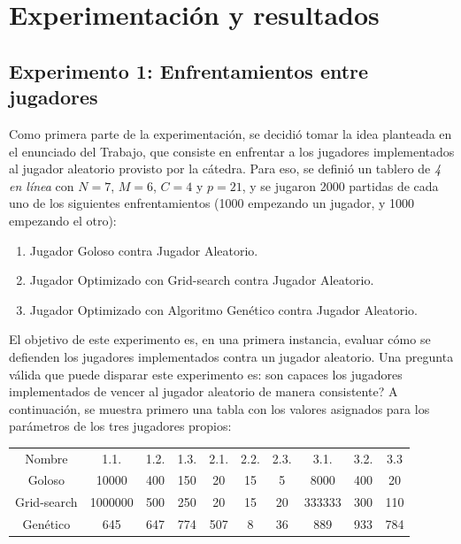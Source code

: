\documentclass[12pt,a4paper]{article}
\begin{document}
\newpage

		
	
\section{Experimentación y resultados}


    \subsection{Experimento 1: Enfrentamientos entre jugadores}
    
    Como primera parte de la experimentación, se decidió tomar la idea planteada en el enunciado del Trabajo, que consiste en enfrentar a los jugadores implementados al jugador aleatorio provisto por la cátedra. Para eso, se definió un tablero de \textit{4 en línea} con $N=7$, $M=6$, $C=4$ y $p=21$, y se jugaron 2000 partidas de cada uno de los siguientes enfrentamientos (1000 empezando un jugador, y 1000 empezando el otro):
        \begin{enumerate}
            \item Jugador Goloso contra Jugador Aleatorio.
            \item Jugador Optimizado con Grid-search contra Jugador Aleatorio.
            \item Jugador Optimizado con Algoritmo Genético contra Jugador Aleatorio.
        \end{enumerate}
    
    El objetivo de este experimento es, en una primera instancia, evaluar cómo se defienden los jugadores implementados contra un jugador aleatorio. Una pregunta válida que puede disparar este experimento es: \textquestiondown son capaces los jugadores implementados de vencer al jugador aleatorio de manera consistente? A continuación, se muestra primero una tabla con los valores asignados para los parámetros de los tres jugadores propios:
    
    \begin{center}
		\begin{tabular}{ | c || c | c | c | c | c | c | c | c | c | }
		\hline
		Nombre &  1.1. &  1.2. &  1.3. &  2.1. &  2.2. &  2.3. &  3.1. &  3.2. &  3.3 \\ \hhline{|=#=|=|=|=|=|=|=|=|=|}
            Goloso &  10000 &  400 &  150 &  20 &  15 &  5 &  8000 &  400 &  20 \\ \hline
		    Grid-search &  1000000 &  500 &  250 &  20 &  15 &  20 &  333333 &  300 &  110 \\ \hline
		    Genético &  645 &  647 &  774 &  507 &  8 &  36 &  889 &  933 &  784 \\ \hline
		\end{tabular}
    \end{center}
    
\end{document}
